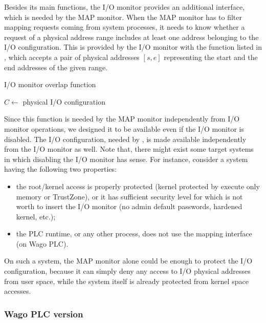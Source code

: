 Besides its main functions, the I/O monitor provides an additional interface, which is needed by the MAP monitor.
When the MAP monitor has to filter mapping requests coming from system processes, it needs to know whether a request of a physical address range includes
at least one address belonging to the I/O configuration. This is provided by the I/O monitor with the function listed in ,
which accepts a pair of physical addresses $[s, e]$ representing the start and the end addresses of the given range.
\begin{algorithm}[h]
\caption{I/O monitor overlap function}
\label{alg:io_overlap}
\begin{algorithmic}[1]
 
	\State $C \gets$ physical I/O configuration 
		 
			\State \Return \True
		\EndIf
	\EndFor
	\State \Return \False
\EndFunction
\end{algorithmic}
\end{algorithm}
Since this function is needed by the MAP monitor independently from I/O monitor operations, we designed it to be available even if the I/O monitor is disabled.
The I/O configuration, needed by , is made available independently from the I/O monitor as well.
Note that, there might exist some target systems in which disabling the I/O monitor has sense. For instance, consider a system having the following two properties:
\begin{itemize}
	\item the root/kernel access is properly protected (\eg kernel protected by execute only memory or TrustZone),
		or it has sufficient security level for which is not worth to insert the I/O monitor (\eg no admin default passwords, hardened kernel, etc.);
	\item the PLC runtime, or any other process, does not use the mapping interface (\ie on Wago PLC).
\end{itemize}
On such a system, the MAP monitor alone could be enough to protect the I/O configuration, because it can simply deny any access to I/O physical addresses from user space,
while the system itself is already protected from kernel space accesses.


\subsubsection{Wago PLC version}

